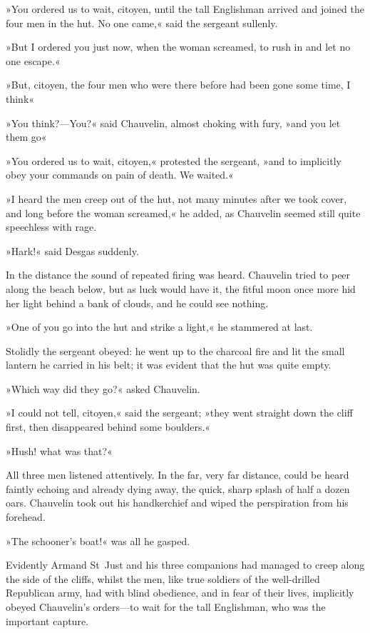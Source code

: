 »You ordered us to wait, citoyen, until the tall Englishman arrived and joined the four men in the hut. No one came,« said the sergeant sullenly.

»But I ordered you just now, when the woman screamed, to rush in and let no one escape.«

»But, citoyen, the four men who were there before had been gone some time, I think\textellipsis«

»You think?—You?\textellipsis« said Chauvelin, almost choking with fury, »and you let them go\textellipsis«

»You ordered us to wait, citoyen,« protested the sergeant, »and to implicitly obey your commands on pain of death. We waited.«

»I heard the men creep out of the hut, not many minutes after we took cover, and long before the woman screamed,« he added, as Chauvelin seemed still quite speechless with rage.

»Hark!« said Desgas suddenly.

In the distance the sound of repeated firing was heard. Chauvelin tried to peer along the beach below, but as luck would have it, the fitful moon once more hid her light behind a bank of clouds, and he could see nothing.

»One of you go into the hut and strike a light,« he stammered at last.

Stolidly the sergeant obeyed: he went up to the charcoal fire and lit the small lantern he carried in his belt; it was evident that the hut was quite empty.

»Which way did they go?« asked Chauvelin.

»I could not tell, citoyen,« said the sergeant; »they went straight down the cliff first, then disappeared behind some boulders.«

»Hush! what was that?«

All three men listened attentively. In the far, very far distance, could be heard faintly echoing and already dying away, the quick, sharp splash of half a dozen oars. Chauvelin took out his handkerchief and wiped the perspiration from his forehead.

»The schooner's boat!« was all he gasped.

Evidently Armand St~Just and his three companions had managed to creep along the side of the cliffs, whilst the men, like true soldiers of the well-drilled Republican army, had with blind obedience, and in fear of their lives, implicitly obeyed Chauvelin's orders—to wait for the tall Englishman, who was the important capture.

